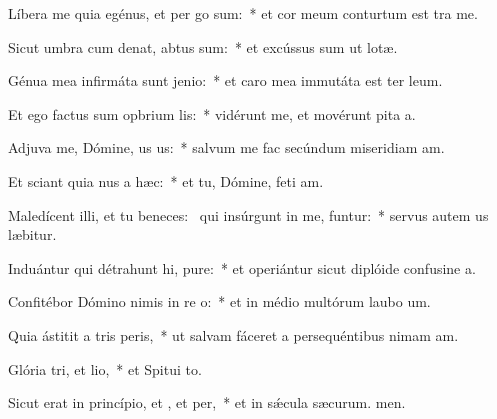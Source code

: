 \item Líbera me quia egénus, et per go sum:~* et cor meum conturtum est tra me.
\item Sicut umbra cum denat, abtus sum:~* et excússus sum ut lotæ.
\item Génua mea infirmáta sunt  jenio:~* et caro mea immutáta est ter leum.
\item Et ego factus sum opbrium lis:~* vidérunt me, et movérunt pita a.
\item Adjuva me, Dómine, us us:~* salvum me fac secúndum miseridiam am.
\item Et sciant quia nus a hæc:~* et tu, Dómine, feti am.
\item Maledícent illi, et tu beneces:~\pscross{} qui insúrgunt in me, funtur:~* servus autem us læbitur.
\item Induántur qui détrahunt hi, pure:~* et operiántur sicut diplóide confusine a.
\item Confitébor Dómino nimis in re o:~* et in médio multórum laubo um.
\item Quia ástitit a tris peris,~* ut salvam fáceret a persequéntibus nimam am.
\item Glória tri, et lio,~* et Spitui to.
\item Sicut erat in princípio, et , et per,~* et in sǽcula sæcurum. men.
